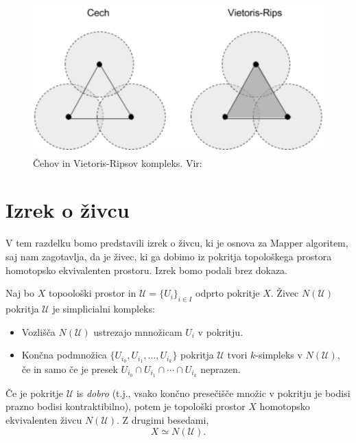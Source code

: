 \begin{figure}[H]
    \centering
    \includegraphics[width=0.7\linewidth]{slike/cech-vs-vietoris-rips-complex.png}
    \caption{Čehov in Vietoris-Ripsov kompleks. Vir: \cite{justinmath_persistent_homology}}
    \label{fig:backprop}
\end{figure}

\section{Izrek o živcu}
V tem razdelku bomo predstavili izrek o živcu, ki je osnova za Mapper algoritem, saj nam zagotavlja, da je živec, ki ga dobimo iz pokritja topološkega prostora homotopsko ekvivalenten prostoru. Izrek bomo podali brez dokaza. \cite{GuzeljBlatnik2020}

\begin{izrek}
Naj bo \( X \) topoološki prostor in \( \mathcal{U} = \{ U_i \}_{i \in I} \) odprto pokritje \( X \). Živec \( N(\mathcal{U}) \) pokritja \( \mathcal{U} \) je simplicialni kompleks:
\begin{itemize}
    \item Vozlišča \( N(\mathcal{U}) \) ustrezajo mnnožicam \( U_i \) v pokritju.
    \item Končna podmnožica \( \{ U_{i_0}, U_{i_1}, \ldots, U_{i_k} \} \) pokritja \( \mathcal{U} \) tvori \( k \)-simpleks v \( N(\mathcal{U}) \), če in samo če je presek \( U_{i_0} \cap U_{i_1} \cap \cdots \cap U_{i_k} \) neprazen.
\end{itemize}
Če je pokritje \( \mathcal{U} \) is \textit{dobro} (t.j., vsako končno presečišče množic v pokritju je bodisi prazno bodisi kontraktibilno), potem je topološki prostor \( X \) homotopsko ekvivalenten živcu \( N(\mathcal{U}) \). Z drugimi besedami,
\[ X \simeq N(\mathcal{U}). \]
\end{izrek}